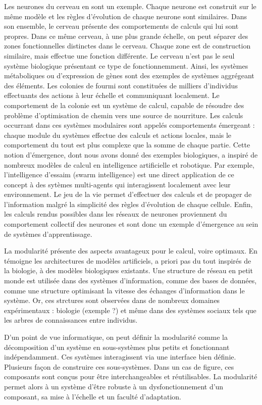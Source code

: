  Les neurones du cerveau en sont un exemple. Chaque neurone est construit sur le même modèle et les règles d'évolution de chaque neurone sont similaires. Dans son ensemble, le cerveau présente des comportements de calculs qui lui sont propres.
Dans ce même cerveau, à  une plus grande échelle, on peut séparer des zones fonctionnelles distinctes dans le cerveau. Chaque zone est de construction similaire, mais effectue une fonction différente.
Le cerveau n'est pas le seul système biologique présentant ce type de fonctionnemment. Ainsi, les systèmes métaboliques ou d'expression de gènes sont des exemples de systèmes aggrégeant des éléments.
Les colonies de fourmi sont constituées de milliers d'individus effectuants des actions à leur échelle et communiquant localement. Le comportement de la colonie est un système de calcul, capable de résoudre des problème d'optimisation de chemin vers une source de nourriture.
Les calculs occurrant dans ces systèmes modulaires sont appelés comportements émergeant : chaque module du systèmes effectue des calculs et actions locales, mais le comportement du tout est plus complexe que la somme de chaque partie.
Cette notion d'émergence, dont nous avons donné des exemples biologiques, a inspiré de nombreux modèles de calcul en intelligence artificielle et robotique.
Par exemple, l'intelligence d'essaim (swarm intelligence) est une direct application de ce concept à des sytèmes multi-agents qui interagissent localement avec leur environnement. 
Le jeu de la vie permet d'effectuer des calculs et de propager de l'information malgré la simplicité des règles d'évolution de chaque cellule. Enfin, les calculs rendus possibles dans les réseaux de neurones proviennent du comportement collectif des neurones et sont donc un exemple d'émergence au sein de systèmes d'apprentissage.


La modularité présente des aspects avantageux pour le calcul, voire optimaux. En témoigne les architectures de modèles artificiels, a priori pas du tout inspirés de la biologie, à des modèles biologiques existants. Une structure de réseau en petit monde est  utilisée dans des systèmes d'information, comme des bases de données, comme une structure optimisant la vitesse des échanges d'information dans le système. Or, ces strctures sont observées dans de nombreux domaines expérimentaux : biologie (exemple ?) et même dans des systèmes sociaux tels que les arbres de connaissances entre individus.

 D'un point de vue informatique, on peut définir la modularité comme la décomposition d'un système en sous-systèmes plus petits et fonctionnant indépendamment. Ces systèmes interagissent via une interface bien définie.
Plusieurs façon de construire ces sous-systèmes. Dans un cas de figure, ces composants sont conçus pour être interchangeables et réutilisables.
La modularité permet alors à un système d'être robuste à un dysfonctionnement d'un composant, sa mise à l'échelle et un faculté d'adaptation.

